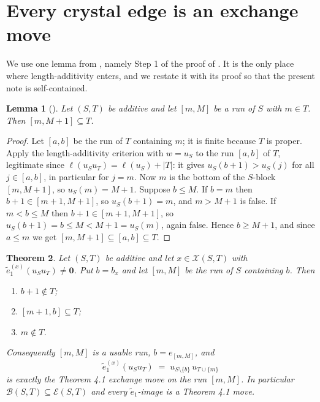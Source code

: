 \documentclass[11pt]{article}
\newtheorem{thm}{Theorem}[section]
\newtheorem{lem}[thm]{Lemma}
\theoremstyle{definition}
\newcommand{\et}{\tilde e_1}
\newcommand{\XX}{\mathcal{X}}
\newcommand{\EE}{\mathcal{E}}
\newcommand{\BB}{\mathcal{B}}
\begin{document}
\section{Every crystal edge is an exchange move}

We use one lemma from \cite{Clio2}, namely Step 1 of the proof of \cite[Lem.~4.2]{Clio2}. It is
the only place where length-additivity enters, and we restate it with its proof so that the
present note is self-contained.

\begin{lem}[{\cite[Lem.~4.2, Step 1]{Clio2}}]\label{lem:step1}
Let $(S,T)$ be additive and let $[m,M]$ be a run of $S$ with $m\in T$. Then
$[m,M+1]\subseteq T$.
\end{lem}

\begin{proof}
Let $[a,b]$ be the run of $T$ containing $m$; it is finite because $T$ is proper. Apply the
length-additivity criterion \cite[Lem.~2.3]{Clio2} with $w=u_S$ to the run $[a,b]$ of $T$,
legitimate since $\ell(u_Su_T)=\ell(u_S)+|T|$: it gives $u_S(b+1)>u_S(j)$ for all $j\in[a,b]$,
in particular for $j=m$. Now $m$ is the bottom of the $S$-block $[m,M+1]$, so $u_S(m)=M+1$.
Suppose $b\le M$. If $b=m$ then $b+1\in[m+1,M+1]$, so $u_S(b+1)=m$, and $m>M+1$ is false. If
$m<b\le M$ then $b+1\in[m+1,M+1]$, so $u_S(b+1)=b\le M<M+1=u_S(m)$, again false. Hence
$b\ge M+1$, and since $a\le m$ we get $[m,M+1]\subseteq[a,b]\subseteq T$.
\end{proof}

\begin{thm}\label{thm:contain}
Let $(S,T)$ be additive and let $x\in\XX(S,T)$ with $\et^{(x)}(u_Su_T)\ne\mathbf 0$. Put
$b=b_x$ and let $[m,M]$ be the run of $S$ containing $b$. Then
\begin{enumerate}
\item[(i)] $b+1\notin T$;
\item[(ii)] $[m+1,b]\subseteq T$;
\item[(iii)] $m\notin T$.
\end{enumerate}
Consequently $[m,M]$ is a usable run, $b=e_{[m,M]}$, and
\[
  \et^{(x)}(u_Su_T)\;=\;u_{S\setminus\{b\}}\,u_{T\cup\{m\}}
\]
is exactly the Theorem 4.1 exchange move on the run $[m,M]$. In particular
$\BB(S,T)\subseteq\EE(S,T)$ and every $\et$-image is a Theorem 4.1 move.
\end{thm}
\end{document}

